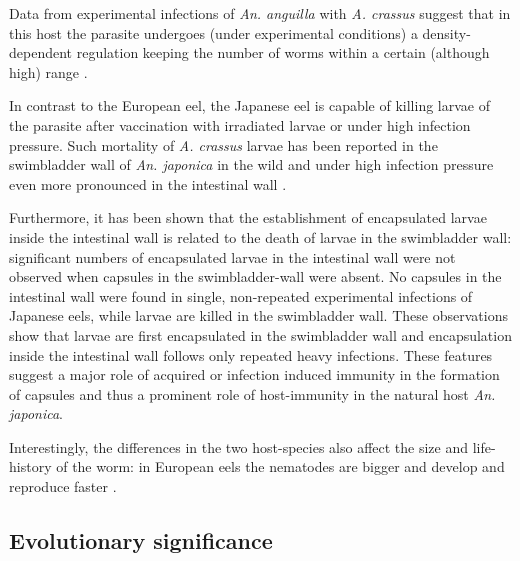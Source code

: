 Data from experimental infections of \textit{An. anguilla} with
\textit{A. crassus} suggest that in this host the parasite undergoes
(under experimental conditions) a density-dependent regulation keeping
the number of worms within a certain (although high) range
\cite{fazio_regulation_2008}.

In contrast to the European eel, the Japanese eel is capable of
killing larvae of the parasite after vaccination with irradiated
larvae \cite{knopf_vaccination_2008} or under high infection pressure.
Such mortality of \textit{A. crassus} larvae has been reported in the
swimbladder wall of \textit{An. japonica} in the wild
\cite{mnderle_occurrence_2006} and under high infection pressure even
more pronounced in the intestinal wall \cite{heitlinger_massive_2009}.

Furthermore, it has been shown that the establishment of encapsulated
larvae inside the intestinal wall is related to the death of larvae in
the swimbladder wall: significant numbers of encapsulated larvae in
the intestinal wall were not observed when capsules in the
swimbladder-wall were absent. No capsules in the intestinal wall were
found in single, non-repeated experimental infections of Japanese
eels, while larvae are killed in the swimbladder wall. These
observations show that larvae are first encapsulated in the
swimbladder wall and encapsulation inside the intestinal wall follows
only repeated heavy infections. These features suggest a major role of
acquired or infection induced immunity in the formation of capsules
\cite{heitlinger_massive_2009} and thus a prominent role of
host-immunity in the natural host \textit{An. japonica}.

Interestingly, the differences in the two host-species also affect the
size and life-history of the worm: in European eels the nematodes are
bigger and develop and reproduce faster \cite{knopf_differences_2004}.



\subsection{Evolutionary significance}
\label{ev-sig}

